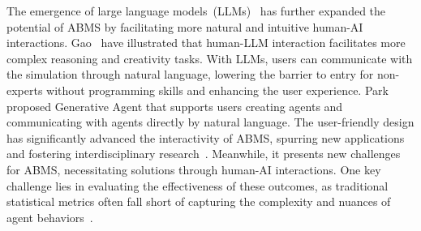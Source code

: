 The emergence of large language models~(LLMs)~\cite{bommasani2022opportunities,brown_language_2020} has further expanded the potential of ABMS by facilitating more natural and intuitive human-AI interactions. 
Gao\etal~\cite{10.1145/3613905.3650786} have illustrated that human-LLM interaction facilitates more complex reasoning and creativity tasks.
With LLMs, users can communicate with the simulation through natural language, lowering the barrier to entry for non-experts without programming skills and enhancing the user experience.
Park\etal~\cite{10.1145/3586183.3606763} proposed Generative Agent that supports users creating agents and communicating with agents directly by natural language.
The user-friendly design has significantly advanced the interactivity of ABMS, spurring new applications and fostering interdisciplinary research~\cite{DBLP:journals/corr/abs-2312-11813,10.1145/3613904.3642159}.
Meanwhile, it presents new challenges for ABMS, necessitating solutions through human-AI interactions. 
One key challenge lies in evaluating the effectiveness of these outcomes, as traditional statistical metrics often fall short of capturing the complexity and nuances of agent behaviors~\cite{10.1145/3526113.3545616, doi:10.1126/science.ade9097}. 

